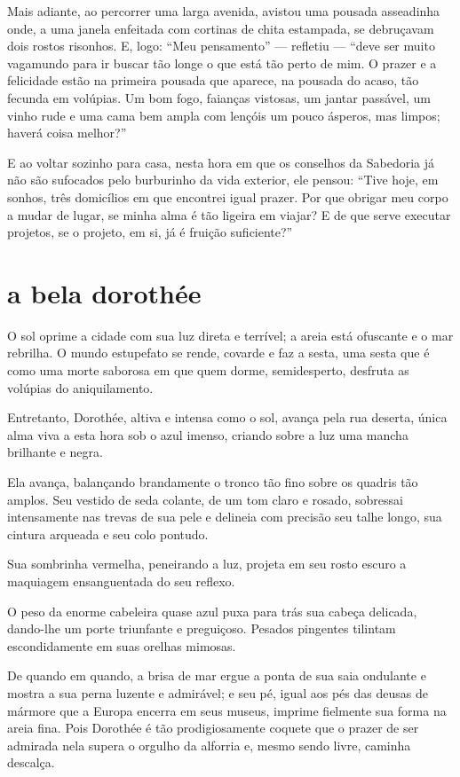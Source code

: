 Mais adiante, ao percorrer uma larga avenida, avistou uma pousada
asseadinha onde, a uma janela enfeitada com cortinas de chita
estampada, se debruçavam dois rostos risonhos. E, logo:
``Meu pensamento'' --- refletiu --- ``deve ser muito vagamundo
para ir buscar tão longe o que está tão perto de mim. O prazer e a
felicidade estão na primeira pousada que aparece, na pousada do
acaso, tão fecunda em volúpias. Um bom fogo, faianças vistosas, um
jantar passável, um vinho rude e uma cama bem ampla com lençóis um
pouco ásperos, mas limpos; haverá coisa melhor?''

E ao voltar sozinho para casa, nesta hora em que os conselhos da
Sabedoria já não são sufocados pelo burburinho da vida exterior,
ele pensou: ``Tive hoje, em sonhos, três domicílios em que
encontrei igual prazer. Por que obrigar meu corpo a mudar de lugar, se minha alma é tão ligeira em viajar? E de que serve executar projetos,
se o projeto, em si, já é fruição suficiente?''

\quebra\section[A bela Dorothée]{a bela dorothée}

O sol oprime a cidade com sua luz direta e terrível; a areia está
ofuscante e o mar rebrilha. O mundo estupefato se rende, covarde e faz
a sesta, uma sesta que é como uma morte saborosa em que quem
dorme, semidesperto, desfruta as volúpias do aniquilamento.

Entretanto, Dorothée, altiva e intensa como o sol, avança pela rua
deserta, única alma viva a esta hora sob o azul imenso, criando sobre a
luz uma mancha brilhante e negra.

Ela avança, balançando brandamente o tronco tão fino sobre os
quadris tão amplos. Seu vestido de seda colante, de um tom claro e
rosado, sobressai intensamente nas trevas de sua pele e delineia com
precisão seu talhe longo, sua cintura arqueada e seu colo pontudo.

Sua sombrinha vermelha, peneirando a luz, projeta em seu rosto escuro a
maquiagem ensanguentada do seu reflexo.

O peso da enorme cabeleira quase azul puxa para trás sua cabeça
delicada, dando-lhe um porte triunfante e preguiçoso. Pesados pingentes
tilintam escondidamente em suas orelhas mimosas.

De quando em quando, a brisa de mar ergue a ponta de sua saia ondulante e
mostra a sua perna luzente e admirável; e seu pé, igual aos pés das deusas
de mármore que a Europa encerra em seus museus, imprime fielmente sua
forma na areia fina. Pois Dorothée é tão prodigiosamente coquete que o
prazer de ser admirada nela supera o orgulho da alforria e, mesmo sendo
livre, caminha descalça.

